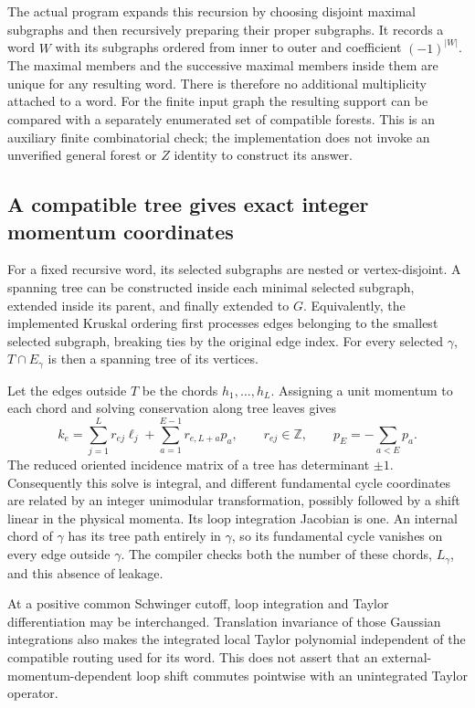 The actual program expands this recursion by choosing disjoint maximal
subgraphs and then recursively preparing their proper subgraphs.  It
records a word $W$ with its subgraphs ordered from inner to outer and
coefficient $(-1)^{|W|}$.  The maximal members and the successive maximal
members inside them are unique for any resulting word.  There is
therefore no additional multiplicity attached to a word.  For the
finite input graph the resulting support can be compared with a
separately enumerated set of compatible forests.  This is an auxiliary
finite combinatorial check; the implementation does not invoke an
unverified general forest or $Z$ identity to construct its answer.

\subsection{A compatible tree gives exact integer momentum coordinates}

For a fixed recursive word, its selected subgraphs are nested or
vertex-disjoint.  A spanning tree can be constructed inside each minimal
selected subgraph, extended inside its parent, and finally extended to
$G$.  Equivalently, the implemented Kruskal ordering first processes
edges belonging to the smallest selected subgraph, breaking ties by the
original edge index.  For every selected $\gamma$,
$T\cap E_\gamma$ is then a spanning tree of its vertices.

Let the edges outside $T$ be the chords $h_1,\ldots,h_L$.  Assigning a
unit momentum to each chord and solving conservation along tree leaves
gives
\[
 k_e=\sum_{j=1}^L r_{ej}\ell_j
       +\sum_{a=1}^{E-1}r_{e,L+a}p_a,
 \qquad r_{ej}\in\mathbb Z,
 \qquad p_E=-\sum_{a<E}p_a.
\]
The reduced oriented incidence matrix of a tree has determinant $\pm1$.
Consequently this solve is integral, and different fundamental cycle
coordinates are related by an integer unimodular transformation,
possibly followed by a shift linear in the physical momenta.  Its loop
integration Jacobian is one.  An internal chord of $\gamma$ has its tree
path entirely in $\gamma$, so its fundamental cycle vanishes on every
edge outside $\gamma$.  The compiler checks both the number of these
chords, $L_\gamma$, and this absence of leakage.

At a positive common Schwinger cutoff, loop integration and Taylor
differentiation may be interchanged.  Translation invariance of those
Gaussian integrations also makes the integrated local Taylor polynomial
independent of the compatible routing used for its word.  This does
not assert that an external-momentum-dependent loop shift commutes
pointwise with an unintegrated Taylor operator.

